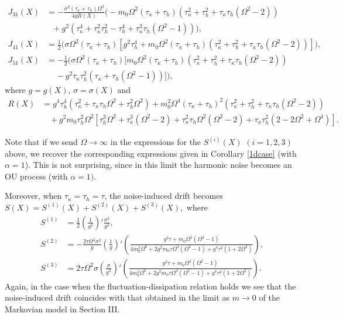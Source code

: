 \begin{corollary}
\begin{align}
J_{31}(X) &= -\frac{\sigma^2(\tau_{\kappa} + \tau_{h}) \Omega^2}{4g R(X)} \bigg(-m_{0}\Omega^2 (\tau_{\kappa} + \tau_{h})(\tau_{\kappa}^2 + \tau_{h}^2 + \tau_{\kappa} \tau_{h} (\Omega^2-2))  \nonumber \\ 
&\ \ \ + g^2(\tau_{\kappa}^4+\tau_{\kappa}^2 \tau_{h}^2 - \tau_{h}^4+\tau_{\kappa}^3 \tau_{h}(\Omega^2-1))   \bigg), \\
J_{41}(X) &= \frac{1}{2} \bigg(\sigma \Omega^2 (\tau_{\kappa}+\tau_{h}) [g^2 \tau_{h}^4 + m_{0} \Omega^2 (\tau_{\kappa}+\tau_{h})(\tau_{\kappa}^2+\tau_{h}^2+\tau_{\kappa}\tau_{h}(\Omega^2-2))] \bigg), \\ 
J_{51}(X) &= -\frac{1}{2} \bigg(\sigma \Omega^2 (\tau_{\kappa}+\tau_{h}) [m_{0} \Omega^2 (\tau_{\kappa}+\tau_{h})(\tau_{\kappa}^2+\tau_{h}^2+\tau_{\kappa}\tau_{h}(\Omega^2-2)) \nonumber \\ 
&\ \ \ \ \ -g^2\tau_{\kappa}\tau_{h}^2(\tau_{\kappa}+\tau_{h}(\Omega^2-1))] \bigg),
\end{align}
where $g=g(X)$, $\sigma = \sigma(X)$ and
\begin{align} 
R(X) &= g^4 \tau_{h}^4 (\tau_{\kappa}^2 + \tau_{\kappa} \tau_{h} \Omega^2+\tau_{h}^2 \Omega^2) + m_{0}^2 \Omega^4 (\tau_{\kappa}+\tau_{h})^2(\tau_{\kappa}^2+\tau_{h}^2+\tau_{\kappa} \tau_{h} (\Omega^2-2)) \nonumber \\ 
&\ \ \ \ +g^2m_{0}\tau_{h}^2 \Omega^2[\tau_{h}^3\Omega^2+\tau_{\kappa}^3(\Omega^2-2)+\tau_{\kappa}^2 \tau_{h}\Omega^2(\Omega^2-2)+\tau_{\kappa}\tau_{h}^2(2-2\Omega^2+\Omega^4)]. 
\end{align}
\end{corollary} 

Note that if we send $\Omega \to \infty$ in the expressions for the $S^{(i)}(X)$ $(i=1,2,3)$ above, we recover the corresponding expressions given in Corollary \ref{1dcase} (with $\alpha =1$). This is not surprising, since in this limit the harmonic noise becomes an OU process (with $\alpha = 1)$. 

Moreover, when $\tau_{\kappa} = \tau_{h} = \tau$, the noise-induced drift becomes $S(X) = S^{(1)}(X)+S^{(2)}(X)+S^{(3)}(X),$ where
\begin{align} 
S^{(1)} &= \frac{1}{2}\left(\frac{1}{g^2}\right)'\frac{\sigma^2}{g^2},\\ 
S^{(2)} &= -\frac{2\tau \Omega^2 \sigma^2}{g} \left(\frac{1}{g}\right)' \left(\frac{g^2 \tau + m_{0}\Omega^2(\Omega^2-1)}{4 m_{0}^2 \Omega^6+2 g^2 m_{0} \tau \Omega^4(\Omega^2-1)+g^4 \tau^2 (1+2\Omega^2)} \right), \\
S^{(3)} &=  2 \tau \Omega^2 \sigma \left( \frac{\sigma}{g^2}\right)' \left(\frac{g^2 \tau + m_{0}\Omega^2(\Omega^2-1)}{4 m_{0}^2 \Omega^6+2 g^2 m_{0} \tau \Omega^4(\Omega^2-1)+g^4 \tau^2 (1+2\Omega^2)} \right). 
\end{align}
Again, in the case when the fluctuation-dissipation relation holds we see that the noise-induced drift coincides with that obtained in the limit as $m \to 0$ of the Markovian model in Section III. 

